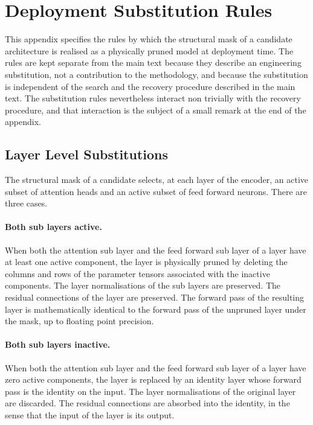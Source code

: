 \section{Deployment Substitution Rules}
\label{app:deploy}

This appendix specifies the rules by which the structural mask of a candidate architecture is realised as a physically pruned model at deployment time. The rules are kept separate from the main text because they describe an engineering substitution, not a contribution to the methodology, and because the substitution is independent of the search and the recovery procedure described in the main text. The substitution rules nevertheless interact non trivially with the recovery procedure, and that interaction is the subject of a small remark at the end of the appendix.

\subsection{Layer Level Substitutions}

The structural mask of a candidate selects, at each layer of the encoder, an active subset of attention heads and an active subset of feed forward neurons. There are three cases.

\paragraph{Both sub layers active.}
When both the attention sub layer and the feed forward sub layer of a layer have at least one active component, the layer is physically pruned by deleting the columns and rows of the parameter tensors associated with the inactive components. The layer normalisations of the sub layers are preserved. The residual connections of the layer are preserved. The forward pass of the resulting layer is mathematically identical to the forward pass of the unpruned layer under the mask, up to floating point precision.

\paragraph{Both sub layers inactive.}
When both the attention sub layer and the feed forward sub layer of a layer have zero active components, the layer is replaced by an identity layer whose forward pass is the identity on the input. The layer normalisations of the original layer are discarded. The residual connections are absorbed into the identity, in the sense that the input of the layer is its output.

